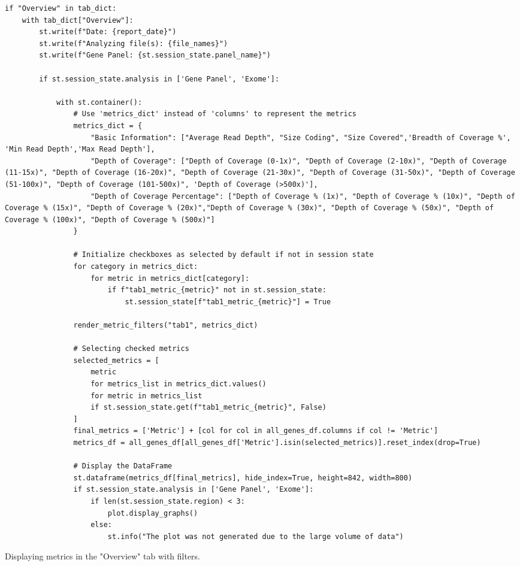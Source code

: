 \begin{longlisting}
\begin{verbatim}
if "Overview" in tab_dict:
    with tab_dict["Overview"]:
        st.write(f"Date: {report_date}")
        st.write(f"Analyzing file(s): {file_names}")
        st.write(f"Gene Panel: {st.session_state.panel_name}")

        if st.session_state.analysis in ['Gene Panel', 'Exome']:
            
            with st.container():
                # Use 'metrics_dict' instead of 'columns' to represent the metrics
                metrics_dict = {
                    "Basic Information": ["Average Read Depth", "Size Coding", "Size Covered",'Breadth of Coverage %', 'Min Read Depth','Max Read Depth'],
                    "Depth of Coverage": ["Depth of Coverage (0-1x)", "Depth of Coverage (2-10x)", "Depth of Coverage (11-15x)", "Depth of Coverage (16-20x)", "Depth of Coverage (21-30x)", "Depth of Coverage (31-50x)", "Depth of Coverage (51-100x)", "Depth of Coverage (101-500x)", 'Depth of Coverage (>500x)'],
                    "Depth of Coverage Percentage": ["Depth of Coverage % (1x)", "Depth of Coverage % (10x)", "Depth of Coverage % (15x)", "Depth of Coverage % (20x)","Depth of Coverage % (30x)", "Depth of Coverage % (50x)", "Depth of Coverage % (100x)", "Depth of Coverage % (500x)"]
                }

                # Initialize checkboxes as selected by default if not in session state
                for category in metrics_dict:
                    for metric in metrics_dict[category]:
                        if f"tab1_metric_{metric}" not in st.session_state:
                            st.session_state[f"tab1_metric_{metric}"] = True

                render_metric_filters("tab1", metrics_dict)

                # Selecting checked metrics
                selected_metrics = [
                    metric
                    for metrics_list in metrics_dict.values()
                    for metric in metrics_list
                    if st.session_state.get(f"tab1_metric_{metric}", False)
                ]
                final_metrics = ['Metric'] + [col for col in all_genes_df.columns if col != 'Metric']
                metrics_df = all_genes_df[all_genes_df['Metric'].isin(selected_metrics)].reset_index(drop=True)

                # Display the DataFrame
                st.dataframe(metrics_df[final_metrics], hide_index=True, height=842, width=800)
                if st.session_state.analysis in ['Gene Panel', 'Exome']:
                    if len(st.session_state.region) < 3:
                        plot.display_graphs()
                    else:
                        st.info("The plot was not generated due to the large volume of data")
\end{verbatim}
\caption{Displaying metrics in the "Overview" tab with filters.}
\label{code:results-overview-tab}
\end{longlisting}

